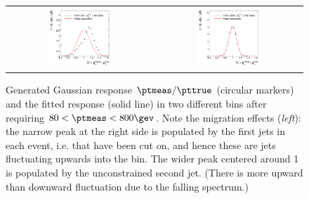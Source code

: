 \begin{figure}[ht]
  \begin{center}
    \begin{tabular}{cc}
     \includegraphics[width=0.45\textwidth]{figures/resFit_ToyMC_PtCuts_ResolutionBin1} &
     \includegraphics[width=0.45\textwidth]{figures/resFit_ToyMC_PtCuts_ResolutionBin7} \\
   \end{tabular}
 \end{center}
  \caption{Generated Gaussian response \mbox{$\ptmeas / \pttrue$}
    (circular markers) and the fitted
    response (solid line) in two different \pttrue bins after
    requiring \mbox{$80 < \ptmeas < 800\gev$}.
    Note the migration effects (\textit{left}): the narrow peak at the
    right side is populated by the first jets in each event, i.e. that have been cut on, and hence these are jets fluctuating upwards into the \pt bin.
    The wider peak centered around 1 is populated by the unconstrained
    second jet.
    (There is more upward than downward fluctuation due to the falling
    \pttrue spectrum.)
  }
  \label{fig:ResFit:ToyMC:PtCuts:Response}
\end{figure}


